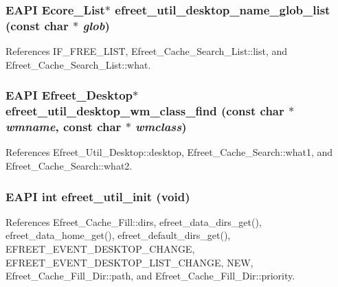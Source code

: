 \subsubsection{\setlength{\rightskip}{0pt plus 5cm}EAPI Ecore\_\-List$\ast$ efreet\_\-util\_\-desktop\_\-name\_\-glob\_\-list (const char $\ast$ {\em glob})}\label{efreet__utils_8c_4e1a01c2e8375828de99e6b91187278d}




References IF\_\-FREE\_\-LIST, Efreet\_\-Cache\_\-Search\_\-List::list, and Efreet\_\-Cache\_\-Search\_\-List::what.
\subsubsection{\setlength{\rightskip}{0pt plus 5cm}EAPI {\bf Efreet\_\-Desktop}$\ast$ efreet\_\-util\_\-desktop\_\-wm\_\-class\_\-find (const char $\ast$ {\em wmname}, \/  const char $\ast$ {\em wmclass})}\label{efreet__utils_8c_3ba379dbad362695a66be9e0ae6bd7df}




References Efreet\_\-Util\_\-Desktop::desktop, Efreet\_\-Cache\_\-Search::what1, and Efreet\_\-Cache\_\-Search::what2.
\subsubsection{\setlength{\rightskip}{0pt plus 5cm}EAPI int efreet\_\-util\_\-init (void)}\label{efreet__utils_8c_0457c008b4cdfac5d753319d0dd65d76}




References Efreet\_\-Cache\_\-Fill::dirs, efreet\_\-data\_\-dirs\_\-get(), efreet\_\-data\_\-home\_\-get(), efreet\_\-default\_\-dirs\_\-get(), EFREET\_\-EVENT\_\-DESKTOP\_\-CHANGE, EFREET\_\-EVENT\_\-DESKTOP\_\-LIST\_\-CHANGE, NEW, Efreet\_\-Cache\_\-Fill\_\-Dir::path, and Efreet\_\-Cache\_\-Fill\_\-Dir::priority.
